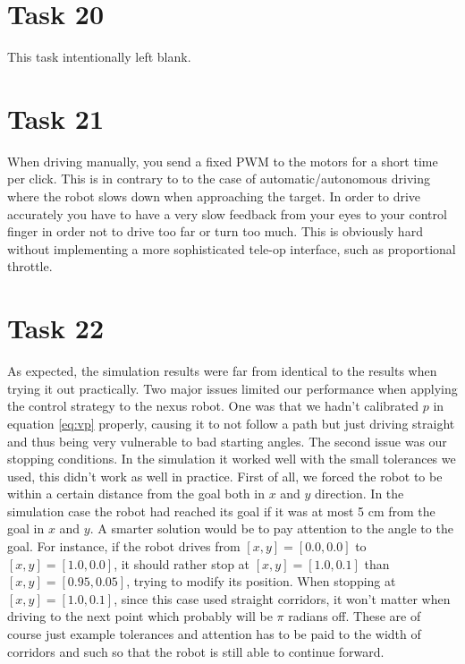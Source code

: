 \documentclass[a4paper,12pt,oneside,onecolumn]{article} %
\begin{document}
\section*{Task 20} %

This task intentionally left blank.

\section*{Task 21}

When driving manually, you send a fixed PWM to the motors for a short time per click. This is in contrary to to the case of automatic/autonomous driving where the robot slows down when approaching the target. In order to drive accurately you have to have a very slow feedback from your eyes to your control finger in order not to drive too far or turn too much. This is obviously hard without implementing a more sophisticated tele-op interface, such as proportional throttle.

\section*{Task 22}

As expected, the simulation results were far from identical to the results when trying it out practically. Two major issues limited our performance when applying the control strategy to the nexus robot. One was that we hadn't calibrated $p$ in equation \eqref{eq:vp} properly, causing it to not follow a path but just driving straight and thus being very vulnerable to bad starting angles. The second issue was our stopping conditions. In the simulation it worked well with the small tolerances we used, this didn't work as well in practice. First of all, we forced the robot to be within a certain distance from the goal both in $x$ and $y$ direction. In the simulation case the robot had reached its goal if it was at most 5 cm from the goal in $x$ and $y$. A smarter solution would be to pay attention to the angle to the goal. For instance, if the robot drives from $[x,y] = [0.0,0.0]$ to $[x,y] = [1.0,0.0]$, it should rather stop at $[x,y] = [1.0,0.1]$ than $[x,y] = [0.95,0.05]$, trying to modify its position. When stopping at $[x,y] = [1.0,0.1]$, since this case used straight corridors, it won't matter when driving to the next point which probably will be $\pi $ radians off. These are of course just example tolerances and attention has to be paid to the width of corridors and such so that the robot is still able to continue forward.
\end{document}
